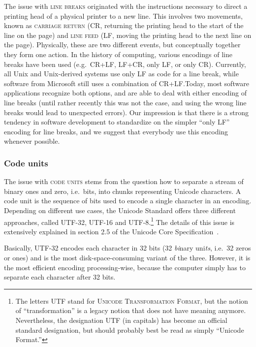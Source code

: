 The issue with \textsc{line breaks} originated with the instructions necessary
to direct a printing head of a physical printer to a new line. This involves two
movements, known as \textsc{carriage return} (CR, returning the printing head to
the start of the line on the page) and \textsc{line feed} (LF, moving the
printing head to the next line on the page). Physically, these are two different
events, but conceptually together they form one action. In the history of
computing, various encodings of line breaks have been used (e.g.~CR+LF, LF+CR,
only LF, or only CR). Currently, all Unix and Unix-derived systems use only LF
as code for a line break, while software from Microsoft still uses a combination
of CR+LF.\@ Today, most software applications recognize both options, and
are able to deal with either encoding of line breaks (until rather recently this
was not the case, and using the wrong line breaks would lead to unexpected
errors). Our impression is that there is a strong tendency in software
development to standardize on the simpler ``only LF'' encoding for line
breaks, and we suggest that everybody use this encoding whenever possible.

\subsubsection*{Code units}

The issue with \textsc{code units} stems from the question how to separate a
stream of binary ones and zero, i.e.~bits, into chunks representing Unicode
characters. A code unit is the sequence of bits used to encode a single
character in an encoding. Depending on different use cases, the Unicode Standard
offers three different approaches, called UTF-32, UTF-16 and UTF-8.\footnote{The
letters UTF stand for \textsc{Unicode Transformation Format}, but the notion of
``transformation'' is a legacy notion that does not have meaning anymore.
Nevertheless, the designation UTF (in capitals) has become an official
standard designation, but should probably best be read as simply ``Unicode
Format.''} The details of this issue is extensively explained in section 2.5 of
the Unicode Core Specification~\citet{Unicode2018}. 

Basically, \textsc{UTF-32} encodes each character in 32 bits (32 \textit{bi}nary
uni\textit{ts}, i.e.~32 zeros or ones) and is the most disk-space-consuming
variant of the three. However, it is the most efficient encoding
processing-wise, because the computer simply has to separate each character
after 32 bits. 

